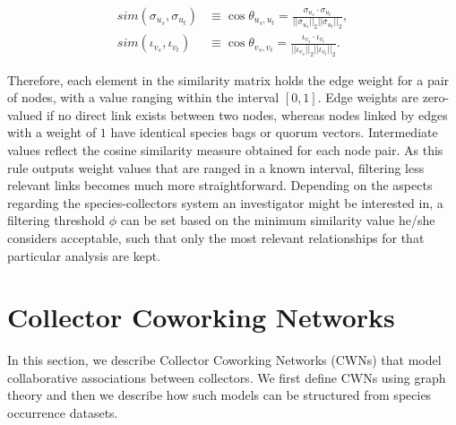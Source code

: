 {\begin{equation}
\label{equation:cosine_similarity}
\begin{split}
sim(\sigma_{u_s},\sigma_{u_t}) &\equiv
\cos \theta_{u_s,u_t} =
\frac{  \sigma_{u_s} \cdot \sigma_{u_t}  }{  ||\sigma_{u_s}||_2  ||\sigma_{u_t}||_2  }, \\
sim(\iota_{v_s},\iota_{v_t}) &\equiv
\cos \theta_{v_s,v_t} =
\frac{  \iota_{v_s} \cdot \iota_{v_t}  }{  ||\iota_{v_s}||_2  ||\iota_{v_t}||_2  }. 
\end{split}
\end{equation}

Therefore, each element in the similarity matrix holds the edge weight for a pair of nodes, with a value ranging within the interval $[0,1]$. Edge weights are zero-valued if no direct link exists between two nodes,  whereas nodes linked by edges with a weight of $1$ have identical species bags or quorum vectors. Intermediate values reflect the cosine similarity measure obtained for each node pair.
As this rule outputs weight values that are ranged in a known interval, filtering less relevant links becomes much more straightforward. Depending on the aspects regarding the species-collectors system an investigator might be interested in, a filtering threshold $\phi$ can be set based on the minimum similarity value he/she considers acceptable, such that only the most relevant relationships for that particular analysis are kept.











%

\section{Collector Coworking Networks} \label{section:cwn}
In this section, we describe Collector Coworking Networks (CWNs) that model collaborative associations between collectors.
We first define CWNs using graph theory and then we describe how such models can be structured from species occurrence datasets.

}
